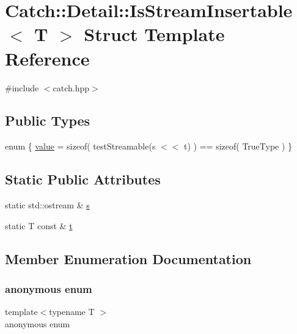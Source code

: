 \hypertarget{struct_catch_1_1_detail_1_1_is_stream_insertable}{}\section{Catch\+:\+:Detail\+:\+:Is\+Stream\+Insertable$<$ T $>$ Struct Template Reference}
\label{struct_catch_1_1_detail_1_1_is_stream_insertable}


{\ttfamily \#include $<$catch.\+hpp$>$}

\subsection*{Public Types}
\begin{DoxyCompactItemize}
\item 
enum \{ \hyperlink{struct_catch_1_1_detail_1_1_is_stream_insertable_a2e4508694da3bf368ff67733a7970edda765a324929702bfce2969fc19fc4f926}{value} = sizeof( test\+Streamable(s $<$$<$ t) ) == sizeof( True\+Type )
 \}
\end{DoxyCompactItemize}
\subsection*{Static Public Attributes}
\begin{DoxyCompactItemize}
\item 
static std\+::ostream \& \hyperlink{struct_catch_1_1_detail_1_1_is_stream_insertable_abe3d3c8e5d85665747faafffc9a96b00}{s}
\item 
static T const  \& \hyperlink{struct_catch_1_1_detail_1_1_is_stream_insertable_a7d2a3da978b6736667a7b2f6d51f507f}{t}
\end{DoxyCompactItemize}


\subsection{Member Enumeration Documentation}
\hypertarget{struct_catch_1_1_detail_1_1_is_stream_insertable_a2e4508694da3bf368ff67733a7970edd}{}\label{struct_catch_1_1_detail_1_1_is_stream_insertable_a2e4508694da3bf368ff67733a7970edd} 
\subsubsection{\texorpdfstring{anonymous enum}{anonymous enum}}
{\footnotesize\ttfamily template$<$typename T $>$ \\
anonymous enum}

